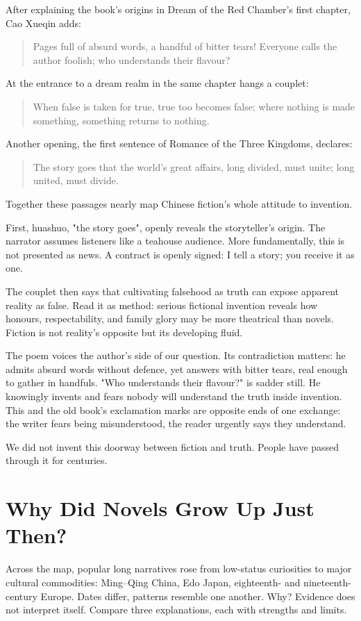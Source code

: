 After explaining the book's origins in Dream of the Red Chamber's first chapter, Cao Xueqin adds:

\begin{quote}
Pages full of absurd words, a handful of bitter tears! Everyone calls the author foolish; who understands their flavour?
\end{quote}
At the entrance to a dream realm in the same chapter hangs a couplet:

\begin{quote}
When false is taken for true, true too becomes false; where nothing is made something, something returns to nothing.
\end{quote}
Another opening, the first sentence of Romance of the Three Kingdoms, declares:

\begin{quote}
The story goes that the world's great affairs, long divided, must unite; long united, must divide.
\end{quote}
Together these passages nearly map Chinese fiction's whole attitude to invention.

First, huashuo, "the story goes", openly reveals the storyteller's origin. The narrator assumes listeners like a teahouse audience. More fundamentally, this is not presented as news. A contract is openly signed: I tell a story; you receive it as one.

The couplet then says that cultivating falsehood as truth can expose apparent reality as false. Read it as method: serious fictional invention reveals how honours, respectability, and family glory may be more theatrical than novels. Fiction is not reality's opposite but its developing fluid.

The poem voices the author's side of our question. Its contradiction matters: he admits absurd words without defence, yet answers with bitter tears, real enough to gather in handfuls. "Who understands their flavour?" is sadder still. He knowingly invents and fears nobody will understand the truth inside invention. This and the old book's exclamation marks are opposite ends of one exchange: the writer fears being misunderstood, the reader urgently says they understand.

We did not invent this doorway between fiction and truth. People have passed through it for centuries.

\section{Why Did Novels Grow Up Just Then?}
Across the map, popular long narratives rose from low-status curiosities to major cultural commodities: Ming--Qing China, Edo Japan, eighteenth- and nineteenth-century Europe. Dates differ, patterns resemble one another. Why? Evidence does not interpret itself. Compare three explanations, each with strengths and limits.

